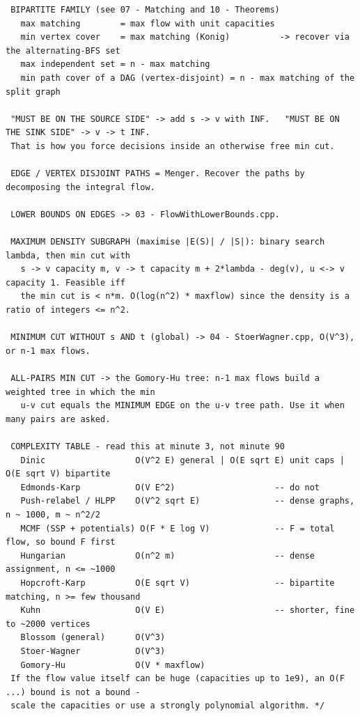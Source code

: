\documentclass[9pt,a4paper,twocolumn]{extarticle}
\begin{document}
\begin{lstlisting}
 BIPARTITE FAMILY (see 07 - Matching and 10 - Theorems)
   max matching        = max flow with unit capacities
   min vertex cover    = max matching (Konig)          -> recover via the alternating-BFS set
   max independent set = n - max matching
   min path cover of a DAG (vertex-disjoint) = n - max matching of the split graph

 "MUST BE ON THE SOURCE SIDE" -> add s -> v with INF.   "MUST BE ON THE SINK SIDE" -> v -> t INF.
 That is how you force decisions inside an otherwise free min cut.

 EDGE / VERTEX DISJOINT PATHS = Menger. Recover the paths by decomposing the integral flow.

 LOWER BOUNDS ON EDGES -> 03 - FlowWithLowerBounds.cpp.

 MAXIMUM DENSITY SUBGRAPH (maximise |E(S)| / |S|): binary search lambda, then min cut with
   s -> v capacity m, v -> t capacity m + 2*lambda - deg(v), u <-> v capacity 1. Feasible iff
   the min cut is < n*m. O(log(n^2) * maxflow) since the density is a ratio of integers <= n^2.

 MINIMUM CUT WITHOUT s AND t (global) -> 04 - StoerWagner.cpp, O(V^3), or n-1 max flows.

 ALL-PAIRS MIN CUT -> the Gomory-Hu tree: n-1 max flows build a weighted tree in which the min
   u-v cut equals the MINIMUM EDGE on the u-v tree path. Use it when many pairs are asked.

 COMPLEXITY TABLE - read this at minute 3, not minute 90
   Dinic                  O(V^2 E) general | O(E sqrt E) unit caps | O(E sqrt V) bipartite
   Edmonds-Karp           O(V E^2)                    -- do not
   Push-relabel / HLPP    O(V^2 sqrt E)               -- dense graphs, n ~ 1000, m ~ n^2/2
   MCMF (SSP + potentials) O(F * E log V)             -- F = total flow, so bound F first
   Hungarian              O(n^2 m)                    -- dense assignment, n <= ~1000
   Hopcroft-Karp          O(E sqrt V)                 -- bipartite matching, n >= few thousand
   Kuhn                   O(V E)                      -- shorter, fine to ~2000 vertices
   Blossom (general)      O(V^3)
   Stoer-Wagner           O(V^3)
   Gomory-Hu              O(V * maxflow)
 If the flow value itself can be huge (capacities up to 1e9), an O(F ...) bound is not a bound -
 scale the capacities or use a strongly polynomial algorithm. */
\end{lstlisting}

\filbreak
\end{document}
